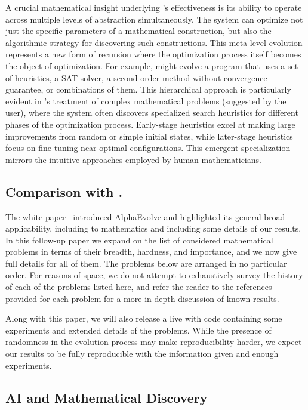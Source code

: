 A crucial mathematical insight underlying \AlphaEvolve's effectiveness is its ability to operate across multiple levels of abstraction simultaneously. The system can optimize not just the specific parameters of a mathematical construction, but also the algorithmic strategy for discovering such constructions. This meta-level evolution represents a new form of recursion where the optimization process itself becomes the object of optimization. For example, \AlphaEvolve might evolve a program that uses a set of heuristics, a SAT solver, a second order method without convergence guarantee, or combinations of them. This hierarchical approach is particularly evident in \AlphaEvolve's treatment of complex mathematical problems (suggested by the user), where the system often discovers specialized search heuristics for different phases of the optimization process. Early-stage heuristics excel at making large improvements from random or simple initial states, while later-stage heuristics focus on fine-tuning near-optimal configurations. This emergent specialization mirrors the intuitive approaches employed by human mathematicians.

\subsection{Comparison with \cite{novikov2025alphaevolve}.}
The white paper~\cite{novikov2025alphaevolve} introduced AlphaEvolve and highlighted its general broad applicability, including to mathematics and including some details of our results. In this follow-up paper we expand on the list of considered mathematical problems in terms of their breadth, hardness, and importance, and we now give full details for all of them. The problems below are arranged in no particular order. For reasons of space, we do not attempt to exhaustively survey the history of each of the problems listed here, and refer the reader to the references provided for each problem for a more in-depth discussion of known results.


Along with this paper, we will also release a live \Repo with code containing some experiments and extended details of the problems. While the presence of randomness in the evolution process may make reproducibility harder, we expect our results to be fully reproducible with the information given and enough experiments.



\subsection{AI and Mathematical Discovery}

